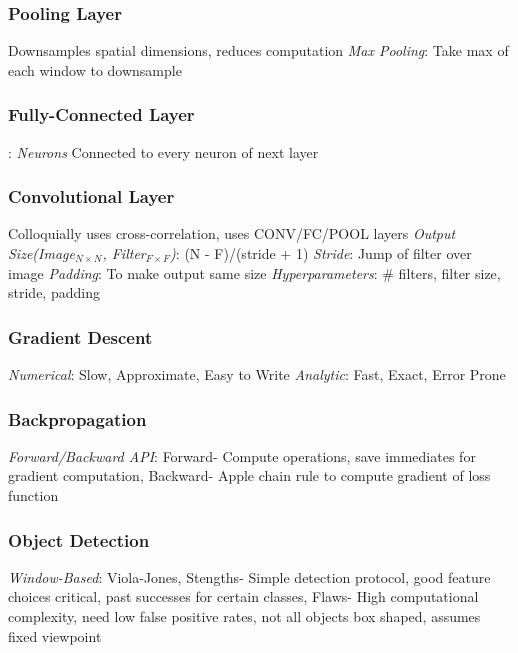 \documentclass{article}
\begin{document}
\begin{multicols*}{2}
        \subsubsection*{Pooling Layer}
        Downsamples spatial dimensions, reduces computation\newline
        \textit{Max Pooling}: Take max of each window to downsample\newline
        \subsubsection*{Fully-Connected Layer}:
        \textit{Neurons} Connected to every neuron of next layer\newline
        \subsubsection*{Convolutional Layer}
        Colloquially uses cross-correlation, uses CONV/FC/POOL layers\newline
        \textit{Output Size(Image$_{N\times N}$, Filter$_{F \times F}$)}: (N - F)/(stride + 1)\newline
        \textit{Stride}: Jump of filter over image\newline
        \textit{Padding}: To make output same size\newline
        \textit{Hyperparameters}: \# filters, filter size, stride, padding\newline
        \subsubsection*{Gradient Descent}
        \textit{Numerical}: Slow, Approximate, Easy to Write\newline
        \textit{Analytic}: Fast, Exact, Error Prone\newline
        \subsubsection*{Backpropagation}
        \textit{Forward/Backward API}: Forward- Compute operations, save immediates for gradient
        computation, Backward- Apple chain rule to compute gradient of loss function\newline
        \subsubsection*{Object Detection}
        \textit{Window-Based}: Viola-Jones, Stengths- Simple detection protocol, good feature
        choices critical, past successes for certain classes, Flaws- High computational
        complexity, need low false positive rates, not all objects box shaped, assumes fixed
        viewpoint\newline

\end{multicols*}
\end{document}
